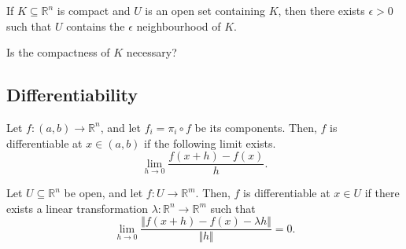 \documentclass[11pt]{article}
\newcommand{\R}{\mathbb{R}}
\newcommand{\norm}[1]{\Vert #1 \Vert}
\theoremstyle{definition}
\theoremstyle{remark}
\numberwithin{equation}{section}
\begin{document}
    \begin{exercise}
        If $K \subseteq \R^n$ is compact and $U$ is an open set containing $K$, then
        there exists $\epsilon > 0$ such that $U$ contains the $\epsilon$
        neighbourhood of $K$.

        Is the compactness of $K$ necessary?
    \end{exercise}
    
    \subsection{Differentiability}
    \begin{definition}
        Let $f \colon (a, b) \to \R^n$, and let $f_i = \pi_i\circ f$ be its
        components. Then, $f$ is differentiable at $x \in (a, b)$ if the following
        limit exists. \[
            \lim_{h \to 0} \frac{f(x + h) - f(x)}{h}.
        \] 
    \end{definition}

    \begin{definition}
        Let $U \subseteq \R^n$ be open, and let $f\colon U \to \R^m$. Then, $f$ is
        differentiable at $x \in U$ if there exists a linear transformation
        $\lambda\colon \R^n \to \R^m$ such that \[
            \lim_{h \to 0} \frac{\norm{f(x + h) - f(x) - \lambda h}}{\norm{h}} = 0.
        \] 
    \end{definition}

    
\end{document}
